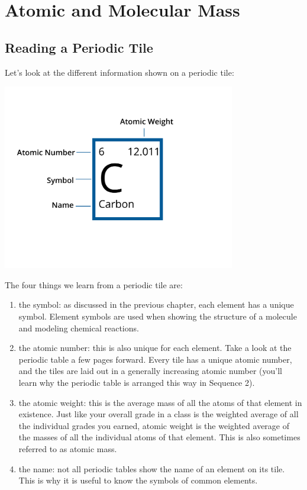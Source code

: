 \chapter{Atomic and Molecular Mass}


\section{Reading a Periodic Tile}

Let's look at the different information shown on a periodic tile:

\begin{center}
\includegraphics[width = 4in]{element.png}
\end{center}

The four things we learn from a periodic tile are:
\begin{enumerate}
\item the symbol: as discussed in the previous chapter, each element has a 
unique symbol. Element symbols are used when showing the structure of a molecule
and modeling chemical reactions. 
\item the atomic number: this is also unique for each element. Take a look at the
periodic table a few pages forward. Every tile has a unique atomic number, and 
the tiles are laid out in a generally increasing atomic number (you'll learn why
the periodic table is arranged this way in Sequence 2). 
\item the atomic weight: this is the average mass of all the atoms of that element
in existence. Just like your overall grade in a class is the weighted average of
all the individual grades you earned, atomic weight is the weighted average of the
masses of all the individual atoms of that element. This is also sometimes referred to as atomic mass.
\item the name: not all periodic tables show the name of an element on its tile.
This is why it is useful to know the symbols of common elements. 
\end{enumerate}

